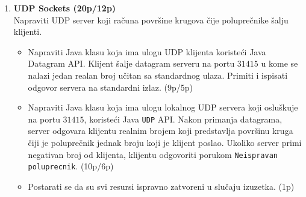 \documentclass[]{article}
\begin{document}
\begin{enumerate}
\vspace{10pt}
\noindent
\begin{tabular}{c c}
  \begin{lstlisting}
(klijent 1)       |
                  |
    ---           |
    ---           |
    ---           |
                  |
    > 5           |
    --O           |
    -X-           |
    ---           |
                  |
    > 6           |
    --O           |
    OXX           |
    ---           |
                  |
    > 2           |
    OXO           |
    OXX           |
    ---           |
                  |
    > 8           |
    OXO           |
    OXX           |
    -X-           |
  \end{lstlisting}&
  \begin{lstlisting}
|      (klijent 2)
|
|          ---
|          -X-
|          ---
|
|          > 3
|          --O
|          -XX
|          ---
|
|          > 4
|          --O
|          OXX
|          -X-
|
|          > 1
|          OXO
|          OXX
|          -X-
|           
|
|
|
  \end{lstlisting}
\end{tabular}

\vspace{15pt}

\item \textbf{UDP Sockets (20p/12p)}
\\Napraviti UDP server koji ra\v{c}una povr\v{s}ine krugova \v{c}ije polupre\v{c}nike \v{s}alju klijenti.
\begin{itemize}
  \item Napraviti Java klasu koja ima ulogu UDP klijenta koriste\'c{}i Java Datagram API. Klijent \v{s}alje datagram serveru na portu $31415$ u kome se nalazi jedan realan broj u\v{c}itan sa standardnog ulaza. Primiti i ispisati odgovor servera na standardni izlaz. \hfill (9p/5p)
  \item Napraviti Java klasu koja ima ulogu lokalnog UDP servera koji oslu\v{s}kuje na portu $31415$, koriste\'c{}i Java \texttt{UDP} API. Nakon primanja datagrama, server odgovara klijentu realnim brojem koji predstavlja povr\v{s}inu kruga \v{c}iji je polupre\v{c}nik jednak broju koji je klijent poslao. Ukoliko server primi negativan broj od klijenta, klijentu odgovoriti porukom \texttt{Neispravan poluprecnik}. \hfill (10p/6p)
  \item Postarati se da su svi resursi ispravno zatvoreni u slu\v{c}aju izuzetka. \hfill (1p)
\end{itemize}

\end{enumerate}
\end{document}
